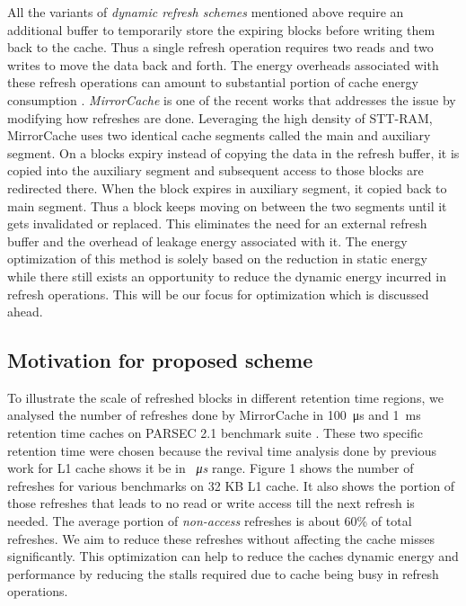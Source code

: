\documentclass[sigconf]{acmart}
\begin{document}
All the variants of \textit{dynamic refresh schemes} mentioned above require an additional buffer to temporarily store the expiring blocks before writing them back to the cache. Thus a single refresh operation requires two reads and two writes to move the data back and forth. The energy overheads associated with these refresh operations can amount to substantial portion of cache energy consumption \cite{compiler}. \textit{MirrorCache}\cite{mirror_cache} is one of the recent works that addresses the issue by modifying how refreshes are done. Leveraging the high density of STT-RAM, MirrorCache uses two identical cache segments called the main and auxiliary segment. On a blocks expiry instead of copying the data in the refresh buffer, it is copied into the auxiliary segment and subsequent access to those blocks are redirected there. When the block expires in auxiliary segment, it copied back to main segment. Thus a block keeps moving on between the two segments until it gets invalidated or replaced. This eliminates the need for an external refresh buffer and the overhead of leakage energy associated with it. The energy optimization of this method is solely based on the reduction in static energy while there still exists an opportunity to reduce the dynamic energy incurred in refresh operations. This will be our focus for optimization which is discussed ahead.

\subsection{Motivation for proposed scheme}

To illustrate the scale of refreshed blocks in different retention time regions, we analysed the number of refreshes done by MirrorCache in \SI{100}{\micro\second} and \SI{1}{\milli\second} retention time caches on PARSEC 2.1 benchmark suite \cite{parsec}. These two specific retention time were chosen because the revival time analysis done by previous work \cite{liang} for L1 cache shows it be in  \textit{\SI{}{\micro\second}} range. 
Figure 1 shows the number of refreshes for various benchmarks on 32 KB L1 cache.
It also shows the portion of those refreshes that leads to no read or write access till the next refresh is needed. The average portion of \textit{non-access} refreshes is about 60\% of total refreshes. We aim to reduce these refreshes without affecting the cache misses significantly. This optimization can help to reduce the caches dynamic energy and performance by reducing the stalls required due to cache being busy in refresh operations. 
\end{document}
